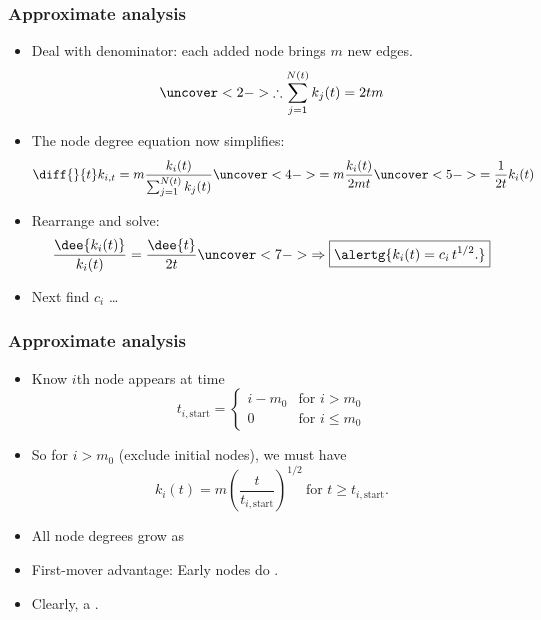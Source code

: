 \begin{frame}[label=]
 \frametitle{Approximate analysis}  

 \begin{block}{}
 \begin{itemize}
 \item<1->
   Deal with denominator: each added node brings $m$ new edges.
   $$
   \uncover<2->{
     \therefore 
     \sum_{j=1}^{N(t)} k_j(t)
     =
     2 t m
   }
   $$
 \item<3->
   The node degree equation now simplifies:
   $$
   \diff{}{t} k_{i,t}
   =
   m
   \frac{k_{i}(t)}
   {
     \sum_{j=1}^{N(t)} k_j(t)
   }
   \uncover<4->{
     =
     m
     \frac{k_{i}(t)}
     {
       2 m t
     }
   }
   \uncover<5->{
     =
     \frac{1}
     {
       2 t
     }
     k_{i}(t)
   }
   $$
 \item<6->
   Rearrange and solve:
   $$
   \frac{\dee{k_{i}(t)}}
   {k_{i}(t)}
   =
   \frac{\dee{t}}
   {2t}
   \uncover<7->{
     \Rightarrow
     \boxed{\alertg{k_i(t) = c_i \,  t^{1/2}.}}
   }
   $$
 \item<8->
   Next find $c_i$ \ldots
 \end{itemize}
 \end{block}

\end{frame}

\begin{frame}[label=]
 \frametitle{Approximate analysis}  

 \begin{block}{}
 \begin{itemize}
 \item<1->
   Know $i$th node appears at time 
   $$
   t_{i,\textrm{start}} = \left\{
     \begin{array}{ll}
       i-m_0 & \mbox{for $i>m_0$} \\
       0 & \mbox{for $i \le m_0$}
     \end{array}
   \right.
   $$
 \item<2->
   So for $i>m_0$ (exclude initial nodes),
   we must have
   $$
   k_i(t) 
   = 
   m 
   \left(
   \frac{t}{t_{i,\textrm{start}}}
   \right)^{1/2}
   \
   \mbox{for $t \ge t_{i,\textrm{start}}$}.
   $$
 \item<3-> 
   All node degrees grow as 
 \item<5-> 
   First-mover advantage: Early nodes do .
 \item<6-> 
   Clearly, a .
 \end{itemize}
 \end{block}
 
\end{frame}

